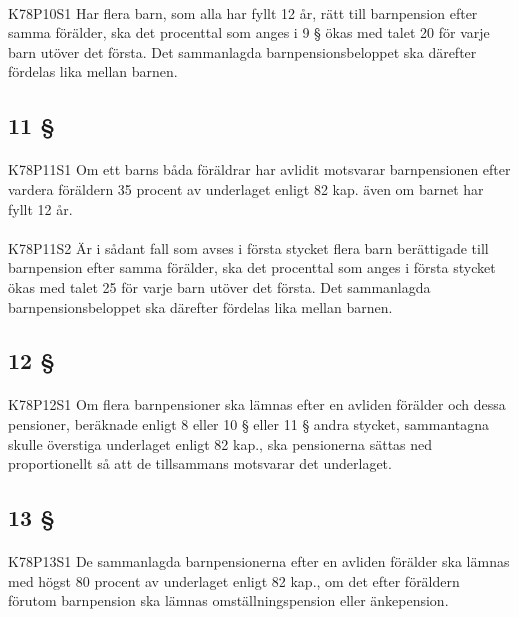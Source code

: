 \documentclass[a4paper,notitlepage,openany,10pt]{book}
\begin{document}
\paragraph*{}
{\tiny K78P10S1}
Har flera barn, som alla har fyllt 12 år, rätt till barnpension efter samma förälder, ska det procenttal som anges i 9 § ökas med talet 20 för varje barn utöver det första. Det sammanlagda barnpensionsbeloppet ska därefter fördelas lika mellan barnen.
\subsection*{11 §}
\paragraph*{}
{\tiny K78P11S1}
Om ett barns båda föräldrar har avlidit motsvarar barnpensionen efter vardera föräldern 35 procent av underlaget enligt 82 kap. även om barnet har fyllt 12 år.
\paragraph*{}
{\tiny K78P11S2}
Är i sådant fall som avses i första stycket flera barn berättigade till barnpension efter samma förälder, ska det procenttal som anges i första stycket ökas med talet 25 för varje barn utöver det första. Det sammanlagda barnpensionsbeloppet ska därefter fördelas lika mellan barnen.
\subsection*{12 §}
\paragraph*{}
{\tiny K78P12S1}
Om flera barnpensioner ska lämnas efter en avliden förälder och dessa pensioner, beräknade enligt 8 eller 10 § eller 11 § andra stycket, sammantagna skulle överstiga underlaget enligt 82 kap., ska pensionerna sättas ned proportionellt så att de tillsammans motsvarar det underlaget.
\subsection*{13 §}
\paragraph*{}
{\tiny K78P13S1}
De sammanlagda barnpensionerna efter en avliden förälder ska lämnas med högst 80 procent av underlaget enligt 82 kap., om det efter föräldern förutom barnpension ska lämnas omställningspension eller änkepension.
\end{document}
